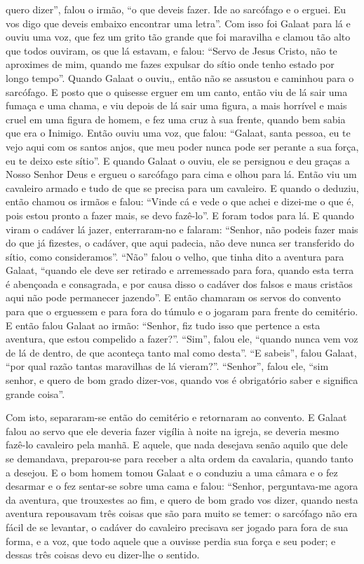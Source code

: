 quero dizer”, falou o irmão, “o que deveis fazer. Ide ao sarcófago e o erguei.
Eu vos digo que deveis embaixo encontrar uma letra”. Com isso foi
Galaat para lá e ouviu uma voz, que fez um grito tão grande que foi maravilha e
clamou tão alto que todos ouviram, os que lá estavam, e falou: “Servo de Jesus
Cristo, não te aproximes de mim, quando me fazes expulsar do sítio onde tenho
estado por longo tempo”. Quando Galaat o ouviu,,  então não se assustou e
caminhou para o sarcófago. E posto que o quisesse  erguer em um canto, então
viu de lá sair uma fumaça e uma chama, e viu depois de lá sair uma figura, a
mais horrível e mais cruel em uma figura de homem, e fez uma cruz à sua frente,
quando bem sabia que era o Inimigo. Então ouviu uma voz, que falou: “Galaat,
santa pessoa, eu te vejo aqui com os santos anjos, que meu poder nunca pode ser
perante a sua força, eu te deixo este sítio”. E quando Galaat o ouviu, ele se
persignou e deu graças a Nosso Senhor Deus e ergueu o sarcófago para cima e
olhou para lá. Então viu um cavaleiro armado e tudo de que se precisa
para um cavaleiro. E quando o deduziu, então chamou os irmãos e falou: “Vinde
cá e vede o que achei e dizei-me o que é, pois estou pronto a fazer mais, se
devo fazê-lo”.  E foram todos para lá. E quando viram o cadáver lá
jazer, enterraram-no e falaram: “Senhor, não podeis fazer mais do que já
fizestes, o cadáver, que aqui padecia, não deve nunca ser transferido do sítio,
como consideramos”. “Não” falou o velho, que tinha dito a aventura para Galaat,
“quando ele deve ser retirado e arremessado para fora, quando esta terra é
abençoada e consagrada, e por causa disso o cadáver dos falsos e maus cristãos
aqui não pode permanecer jazendo”. E então chamaram os servos do
convento para que o erguessem e para fora do túmulo e o jogaram para frente do
cemitério. E então falou Galaat ao irmão: “Senhor, fiz tudo isso que pertence a
esta aventura, que estou compelido a fazer?”. “Sim”, falou ele, “quando nunca
vem voz de lá de dentro, de que aconteça tanto mal como desta”. “E
sabeis”, falou Galaat, “por qual razão tantas maravilhas de lá vieram?”.
“Senhor”, falou ele, “sim senhor, e quero de bom grado dizer-vos, quando vos é
obrigatório saber e significa grande coisa”.

Com isto, separaram-se então do cemitério e retornaram ao convento. E Galaat
falou ao servo que ele deveria fazer vigília à noite na igreja, se deveria
mesmo fazê-lo cavaleiro pela manhã. E aquele, que nada desejava senão aquilo
que dele se demandava, preparou-se para receber a alta ordem da cavalaria,
quando tanto a desejou. E o bom homem tomou Galaat e o conduziu a uma
câmara e o fez desarmar e o fez sentar-se sobre uma cama e falou: “Senhor,
perguntava-me agora da aventura, que trouxestes ao fim, e quero de bom grado
vos dizer, quando nesta aventura repousavam três coisas que são para muito se
temer: o sarcófago não era fácil de se levantar, o cadáver do cavaleiro
precisava ser jogado para fora de sua forma, e a voz, que todo aquele que a
ouvisse perdia sua força e seu poder; e dessas três coisas devo eu dizer-lhe o
sentido. 

